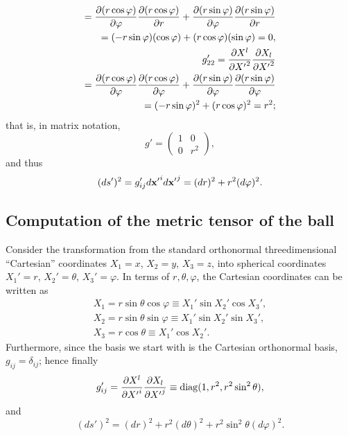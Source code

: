 {\begin{equation}
\begin{split}
=
{\partial (r \cos \varphi) \over \partial {\varphi }}{\partial (r \cos \varphi) \over \partial {r}}
+
{\partial (r \sin \varphi) \over \partial {\varphi }}{\partial (r \sin \varphi) \over \partial {r}}   \\
=
(- r \sin \varphi ) ( \cos \varphi )
+
( r\cos  \varphi )( \sin \varphi )  =0,\\
g'_{22}
= {\partial {X}^l\over \partial {X'}^2}{\partial {X}_l\over \partial {X'}^2} \\
=
{\partial (r \cos \varphi) \over \partial {\varphi}}{\partial (r \cos \varphi) \over \partial {\varphi }}
+
{\partial (r \sin \varphi) \over \partial {\varphi}}{\partial (r \sin \varphi) \over \partial {\varphi }}      \\
=
(- r \sin \varphi )^2
+
( r \cos \varphi )^2  =r^2;
\end{split}
\end{equation}
that is, in matrix notation,
\begin{equation}
g'
=
\begin{pmatrix}
1&0\\
0&r^2
\end{pmatrix}
,
\end{equation}
and thus
\begin{equation}
(d s')^2  = g_{ij}'d{\bf x'}^i d{\bf x'}^j=   (dr)^2 + r^2 (d\varphi )^2.
\label{2014-gppolarc}
\end{equation}







\subsection*{Computation of the metric tensor of the ball}
Consider the transformation from the standard orthonormal
threedimensional ``Cartesian'' coordinates
$X_1=x$,
$X_2=y$,
$X_3=z$,
into spherical coordinates
$X_1'=r$,
$X_2'=\theta$,
$X_3'=\varphi$.
In terms of  $r,\theta , \varphi$, the Cartesian coordinates can be written as
\begin{equation}
\begin{split}
 X_1=r \sin \theta \cos \varphi \equiv X_1' \sin X_2' \cos X_3'  , \\
 X_2=r \sin \theta \sin \varphi \equiv X_1'\sin X_2' \sin X_3'  ,    \\
 X_3=r \cos \theta  \equiv X_1'\cos X_2'  .
\end{split}
\end{equation}
Furthermore,  since the basis we start with is the Cartesian orthonormal basis,
$g_{ij}=\delta_{ij}$; hence finally
\begin{equation}
g'_{ij}= {\partial {X}^l\over \partial {X'}^i}{\partial {X}_l\over \partial {X'}^j}
\equiv {\rm diag}(1,r^2,r^2\sin^2 \theta ),
\end{equation}
and
\begin{equation}
(ds')^2 =(dr)^2+r^2(d\theta )^2+r^2\sin^2 \theta (d\varphi )^2.
\end{equation}

}
